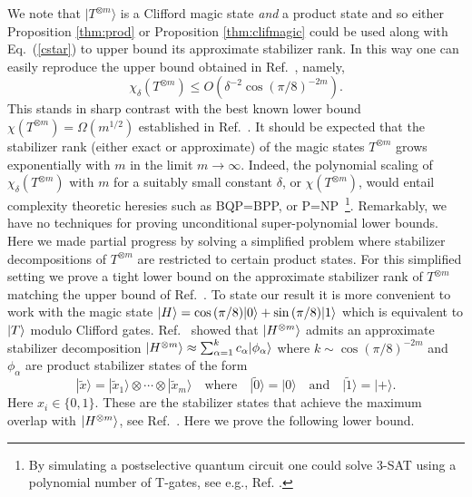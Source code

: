 We note that $|T^{\otimes m}\rangle$ is  a Clifford magic state \textit{and} a product state and so either Proposition \ref{thm:prod} or Proposition \ref{thm:clifmagic} could be used along with Eq.~(\ref{cstar}) to upper bound its approximate stabilizer rank. In this way one can easily reproduce the upper bound obtained in Ref.~\cite{bravyi2016improved},
namely, 
\begin{equation}
\chi_\delta(T^{\otimes m}) \le O\left(\delta^{-2} \cos{(\pi/8)}^{-2m}\right).
\label{eq:chiT}
\end{equation}
This stands in sharp contrast with the best known lower bound $\chi(T^{\otimes m})=\Omega(m^{1/2})$ established in Ref.~\cite{Bravyi16stabRank}. It should be expected that the stabilizer rank (either exact or approximate)
of the magic states $T^{\otimes m}$ grows exponentially with $m$ 
in the limit $m\to \infty$. Indeed, the polynomial scaling of $\chi_{\delta}(T^{\otimes m})$ with $m$ for a suitably small constant $\delta$, or $\chi(T^{\otimes m})$, would entail complexity theoretic heresies such as BQP=BPP,  or P=NP~\footnote{By simulating a postselective quantum circuit one could solve 3-SAT using a polynomial number of T-gates, see e.g., Ref. \cite{alibaba}.}.  
Remarkably, we have no techniques for proving unconditional super-polynomial
lower bounds.
Here we made partial progress by solving a simplified problem
where stabilizer decompositions of $T^{\otimes m}$ are restricted to
certain product states. For this simplified setting
we prove a tight lower bound on the approximate stabilizer rank of $T^{\otimes m}$
matching the upper bound of Ref.~\cite{bravyi2016improved}.
 To state our result it is more
convenient to work with the magic state $|H\rangle=\cos{(\pi/8)}|0\rangle + \sin{(\pi/8)}|1\rangle$
which is equivalent to $|T\rangle$ modulo Clifford gates.
Ref.~\cite{bravyi2016improved} showed that $|H^{\otimes m}\rangle$ admits
an approximate stabilizer decomposition $|H^{\otimes m}\rangle \approx \sum_{\alpha=1}^k c_\alpha |\phi_\alpha\rangle$
where $k\sim \cos{(\pi/8)}^{-2m}$ and $\phi_\alpha$ are product
stabilizer states of the form 
\begin{equation}
|\tilde{x}\rangle =|\tilde{x}_1\rangle \otimes \cdots \otimes |\tilde{x}_m\rangle
\quad \mbox{where} \quad
|\tilde{0}\rangle=|0\rangle \quad \mbox{and} \quad
|\tilde{1}\rangle =|+\rangle. \label{eqn:Hbasis}
\end{equation}
Here $x_i\in \{0,1\}$.
These are the stabilizer states that achieve the maximum overlap with $|H^{\otimes m}\rangle$, see Ref.~\cite{bravyi2016improved}.  Here we prove the following lower bound.
